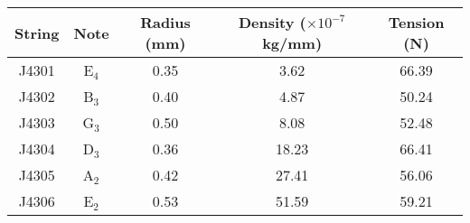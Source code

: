 \begin{tabular}{ccccc}
\toprule
String &     Note &  Radius (mm) &  Density ($\times 10^{-7}$ kg/mm) &  Tension (N) \\
\midrule
 J4301 &  E$_{4}$ &         0.35 &                              3.62 &        66.39 \\
 J4302 &  B$_{3}$ &         0.40 &                              4.87 &        50.24 \\
 J4303 &  G$_{3}$ &         0.50 &                              8.08 &        52.48 \\
 J4304 &  D$_{3}$ &         0.36 &                             18.23 &        66.41 \\
 J4305 &  A$_{2}$ &         0.42 &                             27.41 &        56.06 \\
 J4306 &  E$_{2}$ &         0.53 &                             51.59 &        59.21 \\
\bottomrule
\end{tabular}


